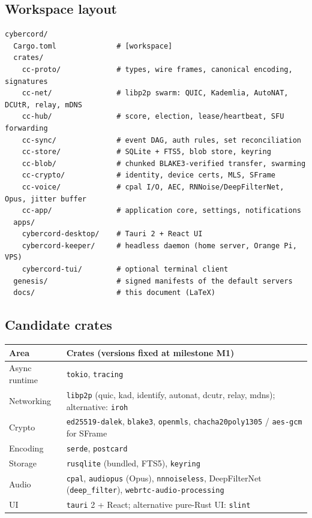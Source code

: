 \documentclass[11pt,a4paper]{article}
\begin{document}
\subsection{Workspace layout}
\begin{lstlisting}[language={},numbers=none]
cybercord/
  Cargo.toml              # [workspace]
  crates/
    cc-proto/             # types, wire frames, canonical encoding, signatures
    cc-net/               # libp2p swarm: QUIC, Kademlia, AutoNAT, DCUtR, relay, mDNS
    cc-hub/               # score, election, lease/heartbeat, SFU forwarding
    cc-sync/              # event DAG, auth rules, set reconciliation
    cc-store/             # SQLite + FTS5, blob store, keyring
    cc-blob/              # chunked BLAKE3-verified transfer, swarming
    cc-crypto/            # identity, device certs, MLS, SFrame
    cc-voice/             # cpal I/O, AEC, RNNoise/DeepFilterNet, Opus, jitter buffer
    cc-app/               # application core, settings, notifications
  apps/
    cybercord-desktop/    # Tauri 2 + React UI
    cybercord-keeper/     # headless daemon (home server, Orange Pi, VPS)
    cybercord-tui/        # optional terminal client
  genesis/                # signed manifests of the default servers
  docs/                   # this document (LaTeX)
\end{lstlisting}

\subsection{Candidate crates}
\begin{center}
\small
\begin{tabularx}{\linewidth}{@{}l Y@{}}
\toprule
\textbf{Area} & \textbf{Crates (versions fixed at milestone M1)} \\
\midrule
Async runtime & \texttt{tokio}, \texttt{tracing} \\
Networking & \texttt{libp2p} (quic, kad, identify, autonat, dcutr, relay, mdns); alternative: \texttt{iroh} \\
Crypto & \texttt{ed25519-dalek}, \texttt{blake3}, \texttt{openmls}, \texttt{chacha20poly1305} / \texttt{aes-gcm} for SFrame \\
Encoding & \texttt{serde}, \texttt{postcard} \\
Storage & \texttt{rusqlite} (bundled, FTS5), \texttt{keyring} \\
Audio & \texttt{cpal}, \texttt{audiopus} (Opus), \texttt{nnnoiseless}, DeepFilterNet (\texttt{deep\_filter}), \texttt{webrtc-audio-processing} \\
UI & \texttt{tauri} 2 + React; alternative pure-Rust UI: \texttt{slint} \\
\bottomrule
\end{tabularx}
\end{center}
\end{document}
